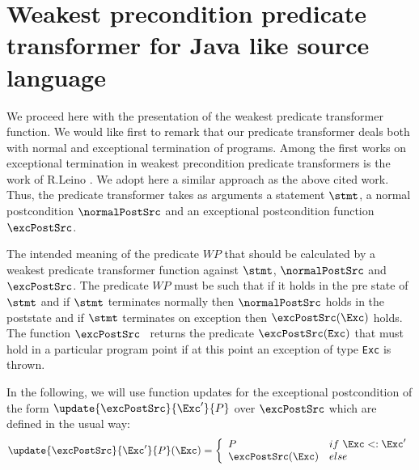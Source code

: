 


\section{Weakest precondition predicate transformer for  Java like source language } \label{pog:wpSrcGeneral}
We proceed here with the presentation of the weakest predicate transformer function. We would like first to remark
that our predicate transformer deals both with normal and exceptional termination of programs.
Among the first works on exceptional termination in weakest precondition predicate transformers is the work of R.Leino \cite{leino94semantics}.
We adopt here a similar approach as the above cited work.  Thus, the predicate transformer
takes as arguments a statement  $\stmt$, a normal postcondition $\normalPostSrc$ and an exceptional postcondition function  $\excPostSrc$.

The intended meaning of the predicate $WP$ that 
should be calculated by a weakest predicate transformer function against  $\stmt$,
$\normalPostSrc$ and  $\excPostSrc$. The predicate    $WP$ must be 
 such that if it holds in the pre state of $\stmt$ and   if $\stmt$ terminates normally then $\normalPostSrc$  holds in the poststate and
 if $\stmt$ terminates on exception \Exc{} then $\excPostSrc(\Exc)$ holds. 
The function $\excPostSrc$ \ returns the predicate $\excPostSrc (\mbox{\rm\texttt{Exc}}) $ that must hold in a particular program point if
 at this point an exception of type \mbox{\rm\texttt{Exc}} is thrown.

In the following, we will use function updates for the exceptional postcondition of the form
 $\update{\excPostSrc}{\Exc'}{ P } $ over $\excPostSrc $ which are defined in the usual way:
$$
\update{\excPostSrc}{\Exc'}{ P }( \Exc )  = 
       \left\{\begin{array}{ll} 
         P & if \ \Exc  <: \Exc'  \\
         \excPostSrc(\Exc ) & else 
     \end{array}\right.$$

